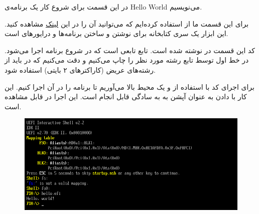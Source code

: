 

در این قسمت برای شروع کار یک برنامه‌ی Hello World می‌نویسیم.


برای این قسمت ما از  استفاده کرده‌ایم که می‌توانید آن را در این \href{https://github.com/tianocore/edk2}{لینک} مشاهده کنید. این ابزار یک سری کتابخانه برای نوشتن و ساختن برنامه‌ها و درایورهای  است.


کد این قسمت در  نوشته شده است. تابع  تابعی است که در شروع برنامه اجرا می‌شود. در خط اول توسط تابع  رشته مورد نظر را چاپ می‌کنیم و دقت می‌کنیم که در  باید از رشته‌های عریض (کاراکترهای ۲ بایتی) استفاده شود.

برای اجرای کد با استفاده از  و  یک محیط  بالا می‌آوریم تا برنامه را در آن اجرا کنیم. این کار با دادن  به عنوان آپشن  به  به سادگی قابل انجام است. این اجرا در  قابل مشاهده است.
\begin{figure}
	\centering
	\includegraphics[width=0.7\linewidth]{figs/helloworld/helloworld1}
	\caption{}
	\label{fig:helloworld1}
\end{figure}
